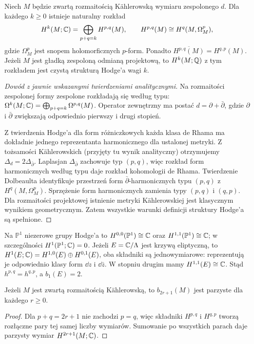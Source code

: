 \begin{twierdzenie}
\label{thm:kahler-hodge-xiv}
Niech $M$ będzie zwartą rozmaitością Kählerowską
wymiaru zespolonego $d$. Dla każdego $k\ge0$
istnieje naturalny rozkład
\[
H^k(M;\mathbb{C})=\bigoplus_{p+q=k}H^{p,q}(M),
\qquad H^{p,q}(M)\cong H^q(M,\Omega_M^p),
\]
gdzie $\Omega_M^p$ jest snopem holomorficznych $p$-form.
Ponadto $\overline{H^{p,q}(M)}=H^{q,p}(M)$.
Jeżeli $M$ jest gładką zespoloną odmianą projektową,
to $H^k(M;\mathbb{Q})$ z tym rozkładem jest czystą
strukturą Hodge'a wagi $k$.
\end{twierdzenie}
\begin{proof}[Dowód z jawnie wskazanymi twierdzeniami analitycznymi]
Na rozmaitości zespolonej formy zespolone rozkładają
się według typu: $\Omega^k(M;\mathbb{C})=
\bigoplus_{p+q=k}\Omega^{p,q}(M)$.
Operator zewnętrzny ma postać
$d=\partial+\bar\partial$,
gdzie $\partial$ i $\bar\partial$ zwiększają
odpowiednio pierwszy i drugi stopień.

Z twierdzenia Hodge'a dla form różniczkowych
każda klasa de Rhama ma dokładnie jednego
reprezentanta harmonicznego dla ustalonej metryki.
Z tożsamości Kählerowskich (przyjęty tu wynik
analityczny) otrzymujemy
$\Delta_d=2\Delta_{\bar\partial}$.
Laplasjan $\Delta_{\bar\partial}$ zachowuje typ
$(p,q)$, więc rozkład form harmonicznych według
typu daje rozkład kohomologii de Rhama.
Twierdzenie Dolbeaulta identyfikuje przestrzeń
form $\bar\partial$-harmonicznych typu $(p,q)$
z $H^q(M,\Omega_M^p)$.
Sprzężenie form harmonicznych zamienia typy
$(p,q)$ i $(q,p)$. Dla rozmaitości projektowej
istnienie metryki Kählerowskiej jest klasycznym
wynikiem geometrycznym. Zatem wszystkie warunki
definicji struktury Hodge'a są spełnione.
\end{proof}

\begin{przyklad}
Na $\mathbb P^1$ niezerowe grupy Hodge'a to
$H^{0,0}(\mathbb P^1)\cong\mathbb{C}$ oraz
$H^{1,1}(\mathbb P^1)\cong\mathbb{C}$; w szczególności
$H^1(\mathbb P^1;\mathbb{C})=0$.
Jeżeli $E=\mathbb{C}/\Lambda$ jest krzywą eliptyczną,
to $H^1(E;\mathbb{C})=H^{1,0}(E)\oplus H^{0,1}(E)$,
oba składniki są jednowymiarowe: reprezentują je
odpowiednio klasy form $\dd z$ i $\dd\bar z$.
W stopniu drugim mamy $H^{1,1}(E)\cong\mathbb{C}$.
Stąd $h^{p,q}=h^{q,p}$, a $b_1(E)=2$.
\end{przyklad}

\begin{wniosek}
Jeżeli $M$ jest zwartą rozmaitością Kählerowską,
to $b_{2r+1}(M)$ jest parzyste dla każdego $r\ge0$.
\end{wniosek}
\begin{proof}
Dla $p+q=2r+1$ nie zachodzi $p=q$, więc
składniki $H^{p,q}$ i $H^{q,p}$ tworzą rozłączne
pary tej samej liczby wymiarów. Sumowanie po
wszystkich parach daje parzysty wymiar $H^{2r+1}(M;\mathbb{C})$.
\end{proof}

